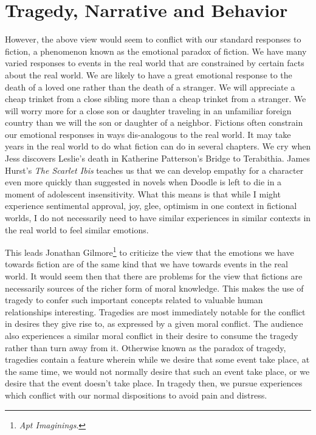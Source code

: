 \documentclass[phdthesis,12pt,final]{wuthesis}
\theoremstyle{definition}
\theoremstyle{definition}
\theoremstyle{definition}
\theoremstyle{definition}
\theoremstyle{remark}
\begin{document}
\section{Tragedy, Narrative and Behavior}\label{tragedy-narrative-and-behavior}

However, the above view would seem to conflict with our standard responses to fiction, a phenomenon known as the emotional paradox of fiction. We have many varied responses to events in the real world that are constrained by certain facts about the real world. We are likely to have a great emotional response to the death of a loved one rather than the death of a stranger. We will appreciate a cheap trinket from a close sibling more than a cheap trinket from a stranger. We will worry more for a close son or daughter traveling in an unfamiliar foreign country than we will the son or daughter of a neighbor. Fictions often constrain our emotional responses in ways dis-analogous to the real world. It may take years in the real world to do what fiction can do in several chapters. We cry when Jess discovers Leslie's death in Katherine Patterson's Bridge to Terabithia. James Hurst's \emph{The Scarlet Ibis} teaches us that we can develop empathy for a character even more quickly than suggested in novels when Doodle is left to die in a moment of adolescent insensitivity. What this means is that while I might experience sentimental approval, joy, glee, optimism in one context in fictional worlds, I do not necessarily need to have similar experiences in similar contexts in the real world to feel similar emotions.

This leads Jonathan Gilmore\footnote{\emph{Apt {Imaginings}}.} to criticize the view that the emotions we have towards fiction are of the same kind that we have towards events in the real world. It would seem then that there are problems for the view that fictions are necessarily sources of the richer form of moral knowledge. This makes the use of tragedy to confer such important concepts related to valuable human relationships interesting. Tragedies are most immediately notable for the conflict in desires they give rise to, as expressed by a given moral conflict. The audience also experiences a similar moral conflict in their desire to consume the tragedy rather than turn away from it. Otherwise known as the paradox of tragedy, tragedies contain a feature wherein while we desire that some event take place, at the same time, we would not normally desire that such an event take place, or we desire that the event doesn't take place. In tragedy then, we pursue experiences which conflict with our normal dispositions to avoid pain and distress.
\end{document}
